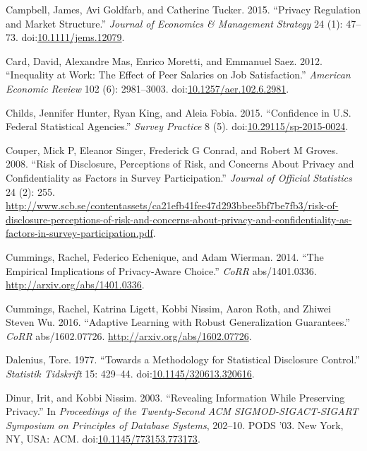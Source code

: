 \documentclass[]{article}
\begin{document}
\hypertarget{ref-Campbell:Privacy:JEMS}{}
Campbell, James, Avi Goldfarb, and Catherine Tucker. 2015. ``Privacy
Regulation and Market Structure.'' \emph{Journal of Economics \&
Management Strategy} 24 (1): 47--73.
doi:\href{https://doi.org/10.1111/jems.12079}{10.1111/jems.12079}.

\hypertarget{ref-CardAER2012}{}
Card, David, Alexandre Mas, Enrico Moretti, and Emmanuel Saez. 2012.
``Inequality at Work: The Effect of Peer Salaries on Job Satisfaction.''
\emph{American Economic Review} 102 (6): 2981--3003.
doi:\href{https://doi.org/10.1257/aer.102.6.2981}{10.1257/aer.102.6.2981}.

\hypertarget{ref-Childs:Confidence:SP:2015}{}
Childs, Jennifer Hunter, Ryan King, and Aleia Fobia. 2015. ``Confidence
in U.S. Federal Statistical Agencies.'' \emph{Survey Practice} 8 (5).
doi:\href{https://doi.org/10.29115/sp-2015-0024}{10.29115/sp-2015-0024}.

\hypertarget{ref-couper2008risk}{}
Couper, Mick P, Eleanor Singer, Frederick G Conrad, and Robert M Groves.
2008. ``Risk of Disclosure, Perceptions of Risk, and Concerns About
Privacy and Confidentiality as Factors in Survey Participation.''
\emph{Journal of Official Statistics} 24 (2): 255.
\url{http://www.scb.se/contentassets/ca21efb41fee47d293bbee5bf7be7fb3/risk-of-disclosure-perceptions-of-risk-and-concerns-about-privacy-and-confidentiality-as-factors-in-survey-participation.pdf}.

\hypertarget{ref-cummings:empirical:corr:2014}{}
Cummings, Rachel, Federico Echenique, and Adam Wierman. 2014. ``The
Empirical Implications of Privacy-Aware Choice.'' \emph{CoRR}
abs/1401.0336. \url{http://arxiv.org/abs/1401.0336}.

\hypertarget{ref-cummings:adaptive:corr:2016}{}
Cummings, Rachel, Katrina Ligett, Kobbi Nissim, Aaron Roth, and Zhiwei
Steven Wu. 2016. ``Adaptive Learning with Robust Generalization
Guarantees.'' \emph{CoRR} abs/1602.07726.
\url{http://arxiv.org/abs/1602.07726}.

\hypertarget{ref-Dalenius:Towards:1977}{}
Dalenius, Tore. 1977. ``Towards a Methodology for Statistical Disclosure
Control.'' \emph{Statistik Tidskrift} 15: 429--44.
doi:\href{https://doi.org/10.1145/320613.320616}{10.1145/320613.320616}.

\hypertarget{ref-Dinur:2003:RIW:773153.773173}{}
Dinur, Irit, and Kobbi Nissim. 2003. ``Revealing Information While
Preserving Privacy.'' In \emph{Proceedings of the Twenty-Second ACM
SIGMOD-SIGACT-SIGART Symposium on Principles of Database Systems},
202--10. PODS '03. New York, NY, USA: ACM.
doi:\href{https://doi.org/10.1145/773153.773173}{10.1145/773153.773173}.
\end{document}
